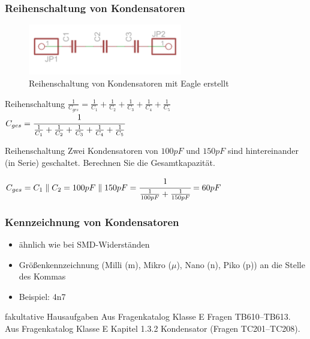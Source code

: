 \begin{frame}
  \frametitle{Reihenschaltung von Kondensatoren}
  \begin{center}
    \begin{figure}
      \includegraphics[width=0.6\textwidth,height=.5\textheight,keepaspectratio]{e05/c-reihe.png}
      \caption{Reihenschaltung von Kondensatoren {\tiny mit Eagle erstellt}}
    \end{figure}
  \end{center}
  \begin{block}{Reihenschaltung}
    $\frac{1}{C_{ges}} = \frac{1}{C_1} + \frac{1}{C_2} + \frac{1}{C_3} + \frac{1}{C_4} + \frac{1}{C_5}$\\
    $C_{ges} = \cfrac{1}{\frac{1}{C_1} + \frac{1}{C_2} + \frac{1}{C_3} + \frac{1}{C_4} + \frac{1}{C_5}}$
  \end{block}
\end{frame}

\begin{frame}
  \begin{exampleblock}{Reihenschaltung}
    Zwei Kondensatoren von $100 pF$ und $150 pF$ sind hintereinander (in Serie) geschaltet. Berechnen Sie die Gesamtkapazität.
  \end{exampleblock}
  \pause
  \begin{center}
    $C_{ges} = C_1 \parallel C_2 = 100 pF \parallel 150 pF = \cfrac{1}{\frac{1}{100 pF} + \frac{1}{150 pF}} = 60 pF$
  \end{center}
\end{frame}
\begin{frame}
\frametitle{Kennzeichnung von Kondensatoren}
\begin{itemize}
\item ähnlich wie bei SMD-Widerständen
\item Größenkennzeichnung (Milli (m), Mikro ($\mu$), Nano (n), Piko (p)) an die Stelle des Kommas
\item Beispiel: 4n7
\end{itemize}
\end{frame}

\begin{frame}
  \begin{alertblock}{fakultative Hausaufgaben}
    Aus Fragenkatalog Klasse E Fragen TB610--TB613.\\
    Aus Fragenkatalog Klasse E Kapitel 1.3.2 Kondensator (Fragen TC201--TC208).
  \end{alertblock}
\end{frame}



